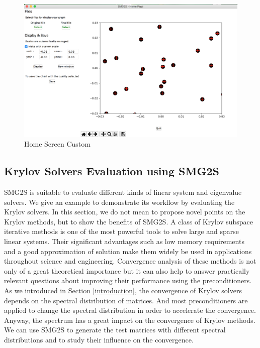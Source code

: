 \begin{figure}[htbp]
	\label{fig:Home Screen custom}
	\caption{Home Screen Custom}
	\centering
	\includegraphics[width=6.2in]{fig/home_screen_custom.png}
\end{figure}


\subsection{Krylov Solvers Evaluation using SMG2S}\label{application}

SMG2S is suitable to evaluate different kinds of linear system and eigenvalue solvers. We give an example to demonstrate its workflow by evaluating the Krylov solvers. In this section, we do not mean to propose novel points on the Krylov methods, but to show the benefits of SMG2S. A class of Krylov subspace iterative methods is one of the most powerful tools to solve large and sparse linear systems. Their significant advantages such as low memory requirements and a good approximation of solution make them widely be used in applications throughout science and engineering. Convergence analysis of these methods is not only of a great theoretical importance but it can also help to answer practically relevant questions about improving their performance using the preconditioners. As we introduced in Section \ref{introduction}, the convergence of Krylov solvers depends on the spectral distribution of matrices. And most preconditioners are applied to change the spectral distribution in order to accelerate the convergence. Anyway, the spectrum has a great impact on the convergence of Krylov methods. We can use SMG2S to generate the test matrices with different spectral distributions and to study their influence on the convergence.

